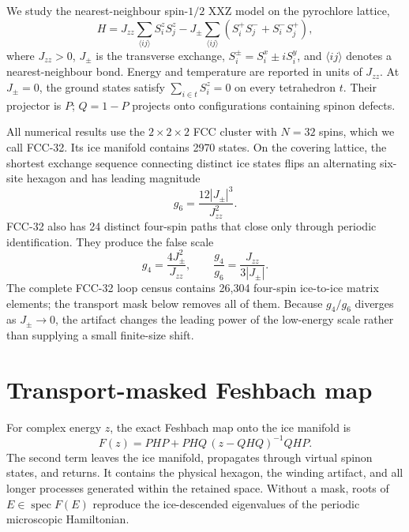 \documentclass[aps,prb,twocolumn,amsmath,amssymb,superscriptaddress,
longbibliography,floatfix]{revtex4-2}
\newcommand{\Jzz}{J_{zz}}
\newcommand{\Jpm}{J_{\pm}}
\begin{document}
We study the nearest-neighbour spin-$1/2$ XXZ model on the pyrochlore lattice,
\begin{equation}
 H=\Jzz\sum_{\langle ij\rangle}S_i^zS_j^z
 -\Jpm\sum_{\langle ij\rangle}
 \left(S_i^+S_j^-+S_i^-S_j^+\right),
 \label{eq:model}
\end{equation}
where $\Jzz>0$, $\Jpm$ is the transverse exchange,
$S_i^\pm=S_i^x\pm iS_i^y$, and $\langle ij\rangle$ denotes a
nearest-neighbour bond.  Energy and temperature are reported in units of
$\Jzz$.  At $\Jpm=0$, the ground states satisfy
$\sum_{i\in t}S_i^z=0$ on every tetrahedron $t$.  Their projector is $P$;
$Q=1-P$ projects onto configurations containing spinon defects.

All numerical results use the $2\times2\times2$ FCC cluster with $N=32$ spins,
which we call FCC-32.  Its ice manifold contains 2970 states.  On the covering
lattice, the shortest exchange sequence connecting distinct ice states flips
an alternating six-site hexagon and has leading magnitude
\begin{equation}
 g_6=\frac{12|\Jpm|^3}{\Jzz^2}.
 \label{eq:g6}
\end{equation}
FCC-32 also has 24 distinct four-spin paths that close only through periodic
identification.  They produce the false scale
\begin{equation}
 g_4=\frac{4\Jpm^2}{\Jzz},\qquad
 \frac{g_4}{g_6}=\frac{\Jzz}{3|\Jpm|}.
 \label{eq:g4}
\end{equation}
The complete FCC-32 loop census contains 26,304 four-spin ice-to-ice matrix
elements; the transport mask below removes all of them.  Because
$g_4/g_6$ diverges as $\Jpm\rightarrow0$, the artifact changes the leading
power of the low-energy scale rather than supplying a small finite-size shift.

\section{Transport-masked Feshbach map}
\label{sec:method}

For complex energy $z$, the exact Feshbach map onto the ice manifold is
\begin{equation}
 F(z)=PHP+PHQ\,(z-QHQ)^{-1}QHP.
 \label{eq:feshbach}
\end{equation}
The second term leaves the ice manifold, propagates through virtual spinon
states, and returns.  It contains the physical hexagon, the winding artifact,
and all longer processes generated within the retained space.  Without a
mask, roots of $E\in\operatorname{spec}F(E)$ reproduce the ice-descended
eigenvalues of the periodic microscopic Hamiltonian.
\end{document}
